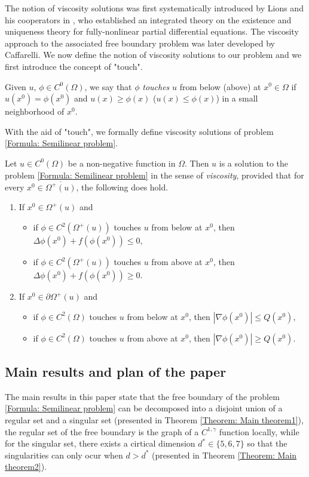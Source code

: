 \documentclass[11pt,reqno]{amsart}
\begin{document}
The notion of viscosity solutions was first systematically introduced by Lions and his cooperators in \cite{CIL1992}, who established an integrated theory on the existence and uniqueness theory for fully-nonlinear partial differential equations. The viscosity approach to the associated free boundary problem was later developed by Caffarelli. We now define the notion of viscosity solutions to our problem and we first introduce the concept of "touch".
\begin{definition}[Touch]
	Given $u$, $\phi\in C^{0}(\Omega)$, we say that $\phi$ \emph{touches} $u$ from below (above) at $x^{0}\in\Omega$ if $u(x^{0})=\phi(x^{0})$ and $u(x)\geqslant\phi(x)$ ($u(x)\leqslant\phi(x)$) in a small neighborhood of $x^{0}$.
\end{definition}
With the aid of "touch", we formally define viscosity solutions of problem \eqref{Formula: Semilinear problem}.
\begin{definition}\label{Definition of viscosity solutions}
	Let $u\in C^{0}(\Omega)$ be a non-negative function in $\Omega$. Then $u$ is a solution to the problem \eqref{Formula: Semilinear problem} in the sense of \emph{viscosity}, provided that for every $x^{0}\in\overline{\varOmega^{+}(u)}$, the following does hold.
	\begin{enumerate}
		\item If $x^{0}\in\varOmega^{+}(u)$ and
		\begin{itemize}
			\item if $\phi\in C^{2}(\varOmega^{+}(u))$ touches $u$ from below at $x^{0}$, then $\Delta\phi(x^{0})+f(\phi(x^{0}))\leqslant0$,
			\item if $\phi\in C^{2}(\varOmega^{+}(u))$ touches $u$ from above at $x^{0}$, then $\Delta\phi(x^{0})+f(\phi(x^{0}))\geqslant0$.
		\end{itemize}
		\item If $x^{0}\in\partial\varOmega^{+}(u)$ and
		\begin{itemize}
			\item if $\phi\in C^{2}(\Omega)$ touches $u$ from below at $x^{0}$, then $|\nabla\phi(x^{0})|\leqslant Q(x^{0})$,
			\item if $\phi\in C^{2}(\Omega)$ touches $u$ from above at $x^{0}$, then $|\nabla\phi(x^{0})|\geqslant Q(x^{0})$.
		\end{itemize}
	\end{enumerate}
\end{definition}
\subsection{Main results and plan of the paper}
The main results in this paper state that the free boundary of the problem \eqref{Formula: Semilinear problem} can be decomposed into a disjoint union of a regular set and a singular set (presented in Theorem \ref{Theorem: Main theorem1}), the regular set of the free boundary is the graph of a $C^{1,\gamma}$ function locally, while for the singular set, there exists a cirtical dimension $d^{*}\in\{5,6,7\}$ so that the singularities can only ocur when $d>d^{*}$ (presented in Theorem \ref{Theorem: Main theorem2}).
\end{document}
